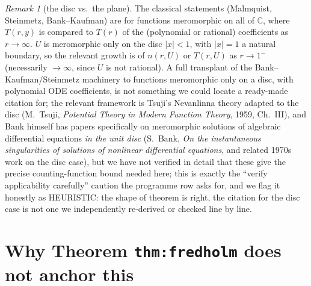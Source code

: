 \documentclass[11pt]{article}
\theoremstyle{remark}
\newtheorem{remark}[theorem]{Remark}
\newcommand{\C}{\mathbb C}
\begin{document}
\begin{remark}[the disc vs.\ the plane]\label{rem:disc}
The classical statements (Malmquist, Steinmetz, Bank--Kaufman) are for functions meromorphic on all
of $\C$, where $T(r,y)$ is compared to $T(r)$ of the (polynomial or rational) coefficients as
$r\to\infty$. $U$ is meromorphic only on the disc $|x|<1$, with $|x|=1$ a natural boundary, so the
relevant growth is of $n(r,U)$ or $T(r,U)$ as $r\to1^-$ (necessarily $\to\infty$, since $U$ is not
rational). A full transplant of the Bank--Kaufman/Steinmetz machinery to functions meromorphic only
on a disc, with polynomial ODE coefficients, is not something we could locate a ready-made citation
for; the relevant framework is Tsuji's Nevanlinna theory adapted to the disc (M.\ Tsuji,
\emph{Potential Theory in Modern Function Theory}, 1959, Ch.\ III), and Bank himself has papers
specifically on meromorphic solutions of algebraic differential equations \emph{in the unit disc}
(S.\ Bank, \emph{On the instantaneous singularities of solutions of nonlinear differential
equations}, and related 1970s work on the disc case), but we have not verified in detail that these
give the precise counting-function bound needed here; this is exactly the ``verify applicability
carefully'' caution the programme row asks for, and we flag it honestly as HEURISTIC: the shape
of theorem is right, the citation for the disc case is not one we independently re-derived or
checked line by line.
\end{remark}

\section{Why Theorem \texttt{thm:fredholm} does not anchor this}\label{sec:fredholm}
\end{document}
